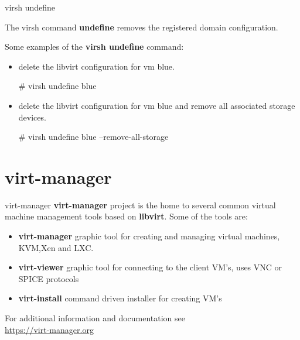 \begin{frame}
   {virsh undefine}

	The virsh command \textbf{undefine} removes the registered 
	domain configuration.

	Some examples of the \textbf{virsh undefine} command: 

	\begin{itemize} 
		\item delete the libvirt configuration for vm blue. 
		\begin{raw}
# virsh undefine blue
		\end{raw}
		\item delete the libvirt configuration for vm blue and remove all associated 
			storage devices.
		\begin{raw}
# virsh undefine blue --remove-all-storage
		\end{raw} 
		\end{itemize}
\end{frame}

\cprotect\note{


}

\section{virt-manager}

\begin{frame}
	{virt-manager}
	\textbf{virt-manager} project is the home to several 
	common virtual machine management tools based on \textbf{libvirt}.
	Some of the tools are: 

	\begin{itemize}
		\item \textbf{virt-manager} graphic tool for creating and 
			managing virtual machines, KVM,Xen and LXC.
		\item \textbf{virt-viewer} graphic tool for connecting to 
			the client VM's, uses VNC or SPICE protocols
		\item \textbf{virt-install} command driven installer for 
			creating VM's
	\end{itemize}

	For additional information and documentation see
	\\
	\url{https://virt-manager.org}

\end{frame}

